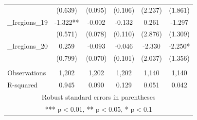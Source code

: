 \documentclass[]{article}
\begin{document}
\begin{tabular}{lccccc}
 & (0.639) & (0.095) & (0.106) & (2.237) & (1.861) \\
\_Iregions\_19 & -1.322** & -0.002 & -0.132 & 0.261 & -1.297 \\
 & (0.571) & (0.078) & (0.110) & (2.876) & (1.309) \\
\_Iregions\_20 & 0.259 & -0.093 & -0.046 & -2.330 & -2.250* \\
 & (0.799) & (0.070) & (0.101) & (2.037) & (1.356) \\
 &  &  &  &  &  \\
Observations & 1,202 & 1,202 & 1,202 & 1,140 & 1,140 \\
 R-squared & 0.945 & 0.090 & 0.129 & 0.051 & 0.042 \\ \hline
\multicolumn{6}{c}{ Robust standard errors in parentheses} \\
\multicolumn{6}{c}{ *** p$<$0.01, ** p$<$0.05, * p$<$0.1} \\
\end{tabular}
\end{document}
